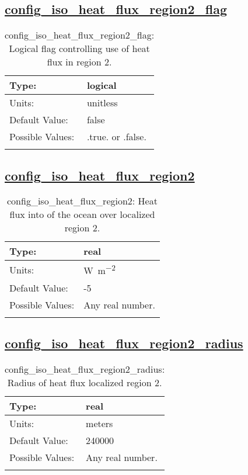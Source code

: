 \subsection[config\_iso\_heat\_flux\_region2\_flag]{\hyperref[sec:nm_tab_iso]{config\_iso\_heat\_flux\_region2\_flag}}
\label{subsec:nm_sec_config_iso_heat_flux_region2_flag}
\begin{center}
\begin{longtable}{| p{2.0in} || p{4.0in} |}
    \hline
    Type: & logical \\
    \hline
    Units: & \si{unitless} \\
    \hline
    Default Value: & false \\
    \hline
    Possible Values: & .true. or .false. \\
    \hline
    \caption{config\_iso\_heat\_flux\_region2\_flag: Logical flag controlling use of heat flux in region 2.}
\end{longtable}
\end{center}
\subsection[config\_iso\_heat\_flux\_region2]{\hyperref[sec:nm_tab_iso]{config\_iso\_heat\_flux\_region2}}
\label{subsec:nm_sec_config_iso_heat_flux_region2}
\begin{center}
\begin{longtable}{| p{2.0in} || p{4.0in} |}
    \hline
    Type: & real \\
    \hline
    Units: & \si{W.m^{-2}} \\
    \hline
    Default Value: & -5 \\
    \hline
    Possible Values: & Any real number. \\
    \hline
    \caption{config\_iso\_heat\_flux\_region2: Heat flux into of the ocean over localized region 2.}
\end{longtable}
\end{center}
\subsection[config\_iso\_heat\_flux\_region2\_radius]{\hyperref[sec:nm_tab_iso]{config\_iso\_heat\_flux\_region2\_radius}}
\label{subsec:nm_sec_config_iso_heat_flux_region2_radius}
\begin{center}
\begin{longtable}{| p{2.0in} || p{4.0in} |}
    \hline
    Type: & real \\
    \hline
    Units: & \si{meters} \\
    \hline
    Default Value: & 240000 \\
    \hline
    Possible Values: & Any real number. \\
    \hline
    \caption{config\_iso\_heat\_flux\_region2\_radius: Radius of heat flux localized region 2.}
\end{longtable}
\end{center}
